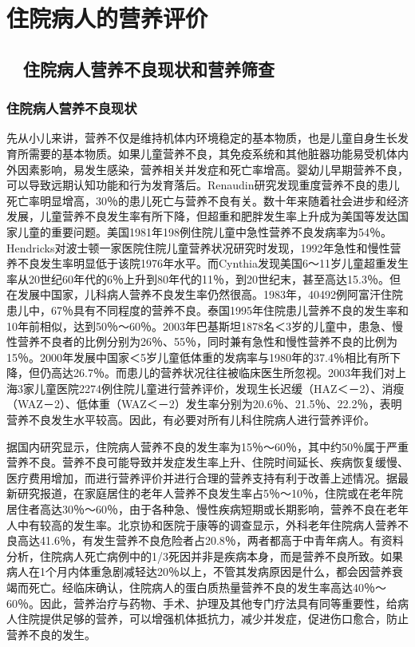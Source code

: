 \chapter{住院病人的营养评价}

\hypertarget{text00002.htmlux5cux23mllj1}{%
\section{　住院病人营养不良现状和营养筛查}\label{text00002.htmlux5cux23mllj1}}

\hypertarget{text00002.htmlux5cux23mllj2}{%
\subsection{住院病人营养不良现状}\label{text00002.htmlux5cux23mllj2}}

先从小儿来讲，营养不仅是维持机体内环境稳定的基本物质，也是儿童自身生长发育所需要的基本物质。如果儿童营养不良，其免疫系统和其他脏器功能易受机体内外因素影响，易发生感染，营养相关并发症和死亡率增高。婴幼儿早期营养不良，可以导致远期认知功能和行为发育落后。Renaudin研究发现重度营养不良的患儿死亡率明显增高，30％的患儿死亡与营养不良有关。数十年来随着社会进步和经济发展，儿童营养不良发生率有所下降，但超重和肥胖发生率上升成为美国等发达国家儿童的重要问题。美国1981年198例住院儿童中急性营养不良发病率为54％。Hendricks对波士顿一家医院住院儿童营养状况研究时发现，1992年急性和慢性营养不良发生率明显低于该院1976年水平。而Cynthia发现美国6～11岁儿童超重发生率从20世纪60年代的6％上升到80年代的11％，到20世纪末，甚至高达15.3％。但在发展中国家，儿科病人营养不良发生率仍然很高。1983年，40492例阿富汗住院患儿中，67％具有不同程度的营养不良。泰国1995年住院患儿营养不良的发生率和10年前相似，达到50％～60％。2003年巴基斯坦1878名＜3岁的儿童中，患急、慢性营养不良者的比例分别为26％、55％，同时兼有急性和慢性营养不良的比例为15％。2000年发展中国家＜5岁儿童低体重的发病率与1980年的37.4％相比有所下降，但仍高达26.7％。而患儿的营养状况往往被临床医生所忽视。2003年我们对上海3家儿童医院2274例住院儿童进行营养评价，发现生长迟缓（HAZ＜－2）、消瘦（WAZ－2）、低体重（WAZ＜－2）发生率分别为20.6％、21.5％、22.2％，表明营养不良发生水平较高。因此，有必要对所有儿科住院病人进行营养评价。

据国内研究显示，住院病人营养不良的发生率为15％～60％，其中约50％属于严重营养不良。营养不良可能导致并发症发生率上升、住院时间延长、疾病恢复缓慢、医疗费用增加，而进行营养评价并进行合理的营养支持有利于改善上述情况。据最新研究报道，在家庭居住的老年人营养不良发生率占5％～10％，住院或在老年院居住者高达30％～60％，由于各种急、慢性疾病短期或长期影响，营养不良在老年人中有较高的发生率。北京协和医院于康等的调查显示，外科老年住院病人营养不良高达41.6％，有发生营养不良危险者占20.8％，两者都高于中青年病人。有资料分析，住院病人死亡病例中的1/3死因并非是疾病本身，而是营养不良所致。如果病人在1个月内体重急剧减轻达20％以上，不管其发病原因是什么，都会因营养衰竭而死亡。经临床确认，住院病人的蛋白质热量营养不良的发生率高达40％～60％。因此，营养治疗与药物、手术、护理及其他专门疗法具有同等重要性，给病人住院提供足够的营养，可以增强机体抵抗力，减少并发症，促进伤口愈合，防止营养不良的发生。

